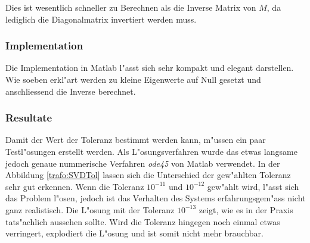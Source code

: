 \begin{refsection}
Dies ist wesentlich schneller zu Berechnen als die Inverse Matrix von $M$, da lediglich die Diagonalmatrix invertiert werden muss.

\subsubsection{Implementation}
Die Implementation in Matlab l"asst sich sehr kompakt und elegant darstellen. Wie soeben erkl"art werden zu kleine Eigenwerte auf Null gesetzt und anschliessend die Inverse berechnet. 

{\scriptsize }

\subsubsection{Resultate}
Damit der Wert der Toleranz bestimmt werden kann, m"ussen ein paar Testl"osungen erstellt werden. Als L"osungsverfahren wurde das etwas langsame jedoch genaue nummerische Verfahren \textit{ode45} von Matlab verwendet. In der Abbildung \ref{trafo:SVDTol} lassen sich die Unterschied der gew"ahlten Toleranz sehr gut erkennen. Wenn die Toleranz $10^{-11}$ und $10^{-12}$ gew"ahlt wird, l"asst sich das Problem l"osen, jedoch ist das Verhalten des Systems erfahrungsgem"ass nicht ganz realistisch. Die L"osung mit der Toleranz $10^{-13}$ zeigt, wie es in der Praxis tats"achlich aussehen sollte. Wird die Toleranz hingegen noch einmal etwas verringert, explodiert die L"osung und ist somit nicht mehr brauchbar.


\end{refsection}

